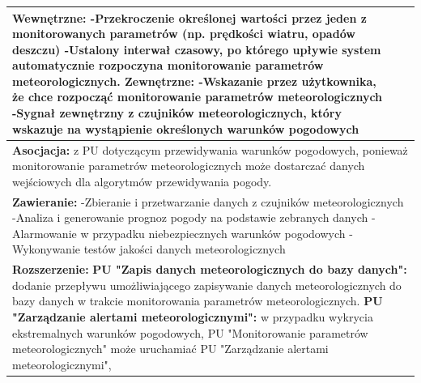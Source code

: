 \documentclass{article}
\begin{document}
\begin{center}
\begin{center}
\begin{tabular}{|l|l|l|}
{        \newline
        \textbf{Wewnętrzne:}
        \newline
        -Przekroczenie określonej wartości przez jeden z monitorowanych parametrów (np. prędkości wiatru, opadów deszczu)
        \newline
        -Ustalony interwał czasowy, po którego upływie system automatycznie rozpoczyna monitorowanie parametrów meteorologicznych.
        \newline
        \textbf{Zewnętrzne:}
        \newline
        -Wskazanie przez użytkownika, że chce rozpocząć monitorowanie parametrów meteorologicznych
        \newline
        -Sygnał zewnętrzny z czujników meteorologicznych, który wskazuje na wystąpienie określonych warunków pogodowych} \\
        \hline
        \hline
        \multicolumn{3}{|p{\dimexpr\linewidth-2\tabcolsep-2\arrayrulewidth}|}{\textbf{Asocjacja:}
        z PU dotyczącym przewidywania warunków pogodowych, ponieważ monitorowanie parametrów
        meteorologicznych może dostarczać danych wejściowych dla algorytmów przewidywania pogody.} \\
        \hline
        \hline
        \multicolumn{3}{|p{\dimexpr\linewidth-2\tabcolsep-2\arrayrulewidth}|}{\textbf{Zawieranie:}
        \newline
        -Zbieranie i przetwarzanie danych z czujników meteorologicznych
        \newline
        -Analiza i generowanie prognoz pogody na podstawie zebranych danych
        \newline
        -Alarmowanie w przypadku niebezpiecznych warunków pogodowych
        \newline
        -Wykonywanie testów jakości danych meteorologicznych} \\
        \hline
        \hline
        \multicolumn{3}{|p{\dimexpr\linewidth-2\tabcolsep-2\arrayrulewidth}|}{\textbf{Rozszerzenie:}
        \newline
        \textbf{PU "Zapis danych meteorologicznych do bazy danych":} dodanie przepływu umożliwiającego zapisywanie danych meteorologicznych do bazy danych w trakcie monitorowania parametrów meteorologicznych.
        \newline
        \textbf{PU "Zarządzanie alertami meteorologicznymi":} w przypadku wykrycia ekstremalnych warunków pogodowych, PU "Monitorowanie parametrów meteorologicznych" może uruchamiać PU "Zarządzanie alertami meteorologicznymi",
}
\end{tabular}
\end{center}
\end{center}
\end{document}
